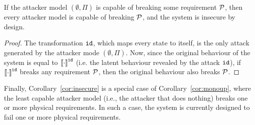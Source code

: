 {\begin{corollary}
  \label{cor:insecure}
  If the attacker model $(\emptyset,\Pi)$ is capable of breaking some requirement $\mathcal{P}$, then every attacker model is capable of breaking $\mathcal{P}$, and the system is insecure by design.
\end{corollary}
\begin{proof}
  The transformation ${\texttt{id}}$, which maps every state to itself, is the only attack generated by the attacker mode $(\emptyset,\Pi)$. Now, since the original behaviour of the system is equal to ${{{\llbracket\cdot\rrbracket}}}^{{\texttt{id}}}$ (i.e. the latent behaviour revealed by the attack ${\texttt{id}}$), if ${{{\llbracket\cdot\rrbracket}}}^{{\texttt{id}}}$ breaks any requirement $\mathcal{P}$, then the original behaviour also breaks $\mathcal{P}$.
\end{proof}
Finally, Corollary~\ref{cor:insecure} is a special case of Corollary~\ref{cor:monoup}, where the least capable attacker model (i.e., the attacker that does nothing) breaks one or more physical requirements. In such a case, the system is currently designed to fail one or more physical requirements. 
 

}
